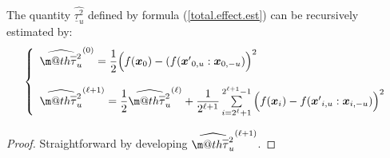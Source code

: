 \documentclass[]{elsarticle}
\makeatletter
\theoremstyle{definition}
\newcommand{\bvec}[1]{\boldsymbol{#1}}
\newcommand{\vx}{\bvec{x}}
\newcommand*{\ov}[1]{
  \m@th\overline{\mbox{#1}\raisebox{2mm}{}}
}
\makeatother
\begin{document}
The quantity $\widehat{\underline{\tau}_u^2}$ defined by formula (\ref{total.effect.est}) can be recursively estimated by:
\begin{equation}
\left\lbrace \begin{array}{l}
\widehat{\ov{$\tau$}_u^2}^{(0)}= \dfrac{1}{2} \Big{(} f(\vx_0)-(f({\vx'}_{0,u}:\vx_{0,-u}) \Big{)}^2 \\
\\
\widehat{\ov{$\tau$}_u^2}^{(\ell+1)} = \dfrac{1}{2} \widehat{\ov{$\tau$}_u^2}^{(\ell)} + \dfrac{1}{2^{\ell+1}} \sum \limits_{i=2^{\ell}+1}^{2^{\ell+1}-1} \Big{(}f(\vx_i)- f({\vx'}_{i,u}:\vx_{i,-u})\Big{)}^2 
\end{array}\right.
\label{total.effect.est.rec}
\end{equation}
\begin{proof}
Straightforward by developing $\widehat{\ov{$\tau$}_u^2}^{(\ell+1)}$.
\end{proof}
\end{document}
